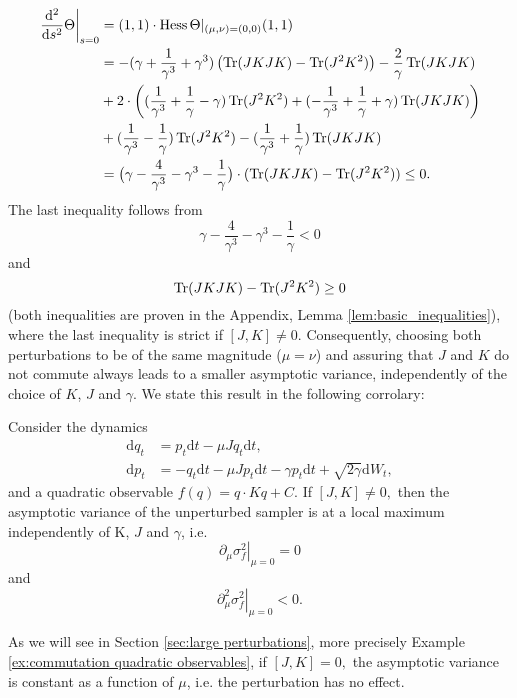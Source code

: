 \begin{align*}
\left. \frac{\mathrm{d}^{2}}{\mathrm{d}s^{2}}\Theta\right\rvert_{s=0} & =(1,1)\cdot\operatorname{Hess}\Theta\vert_{(\mu,\nu)=(0,0)}(1,1)\\
& =-(\gamma+\frac{1}{\gamma^{3}}+\gamma^{3})\left(\operatorname{Tr}(JKJK)-\operatorname{Tr}(J^{2}K^{2})\right)-\frac{2}{\gamma}\operatorname{Tr}(JKJK)\\
& +2\cdot\left((\frac{1}{\gamma^{3}}+\frac{1}{\gamma}-\gamma)\operatorname{Tr}(J^{2}K^{2})+(-\frac{1}{\gamma^{3}}+\frac{1}{\gamma}+\gamma)\operatorname{Tr}(JKJK)\right)\\
& +(\frac{1}{\gamma^{3}}-\frac{1}{\gamma})\operatorname{Tr}(J^{2}K^{2})-(\frac{1}{\gamma^{3}}+\frac{1}{\gamma})\operatorname{Tr}(JKJK)\\
& =\big(\gamma-\frac{4}{\gamma^{3}}-\gamma^{3}-\frac{1}{\gamma}\big)\cdot(\operatorname{Tr}(JKJK)-\operatorname{Tr}(J^{2}K^{2}))\le0.
\end{align*}
The last inequality follows from 
\[
\gamma-\frac{4}{\gamma^{3}}-\gamma^{3}-\frac{1}{\gamma}<0
\]
and 
\[
\operatorname{Tr}(JKJK)-\operatorname{Tr}(J^{2}K^{2})\ge0
\]
(both inequalities are proven in the Appendix, Lemma \ref{lem:basic_inequalities}), where the last inequality
is strict if $[J,K]\neq0$. Consequently, choosing both perturbations
to be of the same magnitude ($\mu=\nu$) and assuring that $J$ and
$K$ do not commute always leads to a smaller asymptotic variance,
independently of the choice of $K$, $J$ and $\gamma$. We state
this result in the following corrolary:
\begin{corollary}
	\label{cor:unit covariance quadratic obs}Consider the dynamics 
	\begin{align}
	\mathrm{d}q_{t} & =p_{t}\mathrm{d}t-\mu Jq_{t}\mathrm{d}t\nonumber, \\
	\mathrm{d}p_{t} & =-q_{t}\mathrm{d}t-\mu Jp_{t}\mathrm{d}t-\gamma p_{t}\mathrm{d}t+\sqrt{2\gamma}\mathrm{d}W_{t},\label{eq: unit covariance-1}
	\end{align}
 and a quadratic observable $f(q)=q\cdot Kq+C$. If $[J,K] \neq 0,$
	then the asymptotic variance of the unperturbed sampler is at a local
	maximum independently of K, $J$ and $\gamma$, i.e. 
	\[
	\left. \partial_{\mu}\sigma_{f}^{2}\right\rvert_{\mu=0}=0
	\]
	and 
	\[
	\left. \partial_{\mu}^{2}\sigma_{f}^{2}\right\rvert_{\mu=0}<0.
	\]
\end{corollary}
\begin{remark}
	As we will see in Section \ref{sec:large perturbations}, more precisely Example \ref{ex:commutation quadratic observables}, if $[J,K]=0,$
	the asymptotic variance is constant as a function of $\mu$, i.e.
	the perturbation has no effect.\end{remark}
